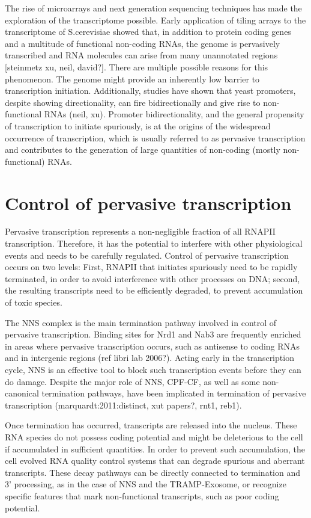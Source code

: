 The rise of microarrays and next generation sequencing techniques has made the exploration of the transcriptome possible. 
Early application of tiling arrays to the transcriptome of S.cerevisiae showed that, in addition to protein coding genes and a multitude of functional non-coding RNAs, the genome is pervasively transcribed and RNA molecules can arise from many unannotated regions [steinmetz xu, neil, david?]. 
There are multiple possible reasons for this phenomenon. 
The genome might provide an inherently low barrier to transcription initiation. 
Additionally, studies have shown that yeast promoters, despite showing directionality, can fire bidirectionally and give rise to non-functional RNAs (neil, xu). 
Promoter bidirectionality, and the general propensity of transcription to initiate spuriously, is at the origins of the widespread occurrence of transcription, which is usually referred to as pervasive transcription and contributes to the generation of large quantities of non-coding (mostly non-functional) RNAs. 

\section{Control of pervasive transcription}

Pervasive transcription represents a non-negligible fraction of all RNAPII transcription. 
Therefore, it has the potential to interfere with other physiological events and needs to be carefully regulated. 
Control of pervasive transcription occurs on two levels: First, RNAPII that initiates spuriously need to be rapidly terminated, in order to avoid interference with other processes on DNA; second, the resulting transcripts need to be efficiently degraded, to prevent accumulation of toxic species. 

The NNS complex is the main termination pathway involved in control of pervasive transcription. 
Binding sites for Nrd1 and Nab3 are frequently enriched in areas where pervasive transcription occurs, such as antisense to coding RNAs and in intergenic regions (ref libri lab 2006?). 
Acting early in the transcription cycle, NNS is an effective tool to block such transcription events before they can do damage. 
Despite the major role of NNS, CPF-CF, as well as some non-canonical termination pathways, have been implicated in termination of pervasive transcription (marquardt:2011:distinct, xut papers?, rnt1, reb1).

Once termination has occurred, transcripts are released into the nucleus. 
These RNA species do not possess coding potential and might be deleterious to the cell if accumulated in sufficient quantities. 
In order to prevent such accumulation, the cell evolved RNA quality control systems that can degrade spurious and aberrant transcripts. 
These decay pathways can be directly connected to termination and 3’ processing, as in the case of NNS and the TRAMP-Exosome, or recognize specific features that mark non-functional transcripts, such as poor coding potential.

